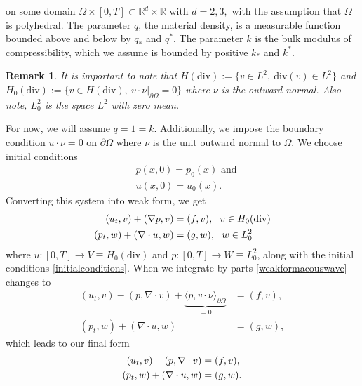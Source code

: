 \documentclass[11pt]{article}
\newtheorem{remark}{Remark}[section]
\newcommand{\R}{\mathbb{R}}
\newcommand{\divv}{\mathrm{div}}
\begin{document}
on some domain $\Omega \times [0,T] \subset \R^d \times \R$ with $d = 2,3,$ with the assumption that $\Omega$ is polyhedral. The parameter $q$, the material density, is a measurable function bounded above and below by $q_*$ and $q^*$. The parameter $k$ is the bulk modulus of compressibility, which we assume is bounded by positive $k_*$ and $k^*$.
\begin{remark}
	It is important to note that $H(\divv):= \{v \in L^2,\: \divv(v) \in L^2\}$ and $H_0(\divv) := \{ v\in H(\divv),\: v \cdot \nu|_{\partial \Omega} = 0 \}$ where $\nu$ is the outward normal. Also note, $L^2_0$ is the space $L^2$ with zero mean.
\end{remark}
For now, we will assume $q = 1 = k$. Additionally, we impose the boundary condition $u \cdot \nu = 0$ on $\partial\Omega$ where $\nu$ is the unit outward normal to $\Omega$. We choose initial conditions
\begin{equation}\label{initialconditions}
\begin{split}
&p(x,0) = p_0(x) \text{ and}\\
&u(x,0) = u_0(x).
\end{split}
\end{equation}
Converting this system into weak form, we get
\begin{equation}{\label{weakformacouswave}}
\begin{split}
(u_t,v) + (\nabla p,v) &= (f,v), \:\:\: v \in H_0(\divv) \\
(p_t, w) + (\nabla \cdot u,w) &= (g,w), \:\:\: w \in L_0^2
\end{split}
\end{equation}
where $u:[0,T] \rightarrow V \equiv H_0(\divv)$ and $p:[0,T] \rightarrow W \equiv L_0^2$, %
 along with the initial conditions \eqref{initialconditions}.
When we integrate by parts \eqref{weakformacouswave} changes to 
\begin{equation}
\begin{split}
(u_t,v) - (p,\nabla \cdot v) + \underbrace{\langle p, v \cdot \nu \rangle_{\partial\Omega}}_{=0} &= (f,v), \\
(p_t, w) + (\nabla \cdot u,w) &= (g,w),
\end{split}
\end{equation}
which leads to our final form 
\begin{equation}{\label{finalformacouswave}}
\begin{split}
(u_t,v) - (p,\nabla \cdot v) &= (f,v),\\
(p_t, w) + (\nabla \cdot u,w) &= (g,w).
\end{split}
\end{equation}
\end{document}
